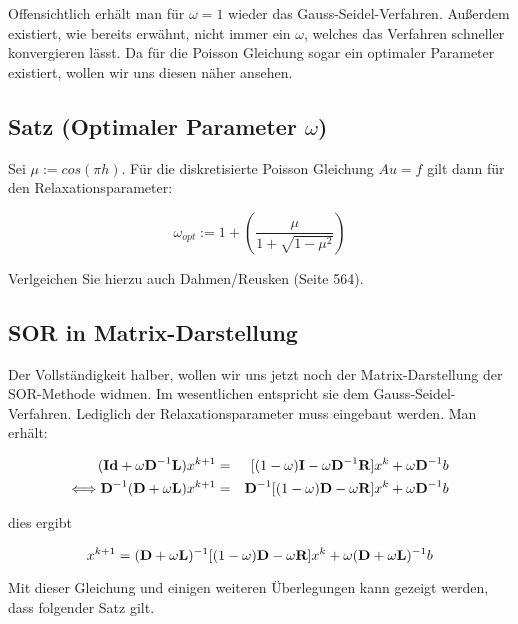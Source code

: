Offensichtlich erhält man für $\omega = 1$ wieder das Gauss-Seidel-Verfahren. Außerdem existiert, wie bereits erwähnt, nicht immer ein $\omega$, welches das Verfahren schneller konvergieren lässt. Da für die Poisson Gleichung sogar ein optimaler Parameter existiert, wollen wir uns diesen näher ansehen.

\subsection{Satz (Optimaler Parameter $\omega$)}\label{ss.optimales omega}

Sei $\mu := cos(\pi h)$. Für die diskretisierte Poisson Gleichung $Au = f$ gilt dann für den Relaxationsparameter:

\begin{equation}
\omega_{opt} := 1 + \left( \frac {\mu} {1 + \sqrt{1 - \mu^{2}}} \right)
\end{equation}

Verlgeichen Sie hierzu auch Dahmen/Reusken (Seite 564).

\subsection{SOR in Matrix-Darstellung}\label{ss.Matrixdarstellung}

Der Vollständigkeit halber, wollen wir uns jetzt noch der Matrix-Darstellung der SOR-Methode widmen. Im wesentlichen entspricht sie dem Gauss-Seidel-Verfahren. Lediglich der Relaxationsparameter muss eingebaut werden. Man erhält:

\begin{eqnarray}
({\textbf{Id}}+\omega{\textbf{D}}^{-1}{\textbf{L}})x^{k+1} &=& [(1-\omega){\textbf{I}}-\omega{\textbf{D}}^{-1}{\textbf{R}}]x^{k} + \omega{\textbf{D}}^{-1}b \notag \\
\Longleftrightarrow {\textbf{D}}^{-1}({\textbf{D}}+\omega{\textbf{L}})x^{k+1} &=& {\textbf{D}}^{-1}[(1-\omega){\textbf{D}}-\omega{\textbf{R}}]x^{k} + \omega{\textbf{D}}^{-1}b \notag \\
\end{eqnarray}

dies ergibt

\begin{equation}
x^{k+1} = ({\textbf{D}}+\omega{\textbf{L}})^{-1}[(1-\omega){\textbf{D}}-\omega{\textbf{R}}]x^{k}+\omega({\textbf{D}}+\omega{\textbf{L}})^{-1}b
\end{equation}

Mit dieser Gleichung und einigen weiteren Überlegungen kann gezeigt werden, dass folgender Satz gilt.

